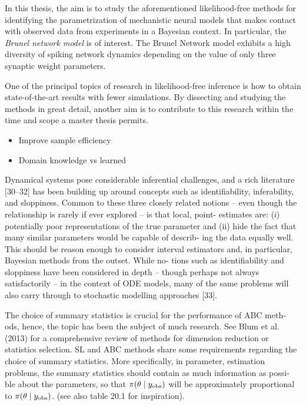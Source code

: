 In this thesis, the aim is to study the aforementioned likelihood-free methods for identifying the parametrization of mechanistic neural models that makes contact with observed data from experiments in a Bayesian context. In particular, the \textit{Brunel network model} is of interest. The Brunel Network model exhibits a high diversity of spiking network dynamics depending on the value of only three synaptic weight parameters.

One of the principal topics of research in likelihood-free inference is how to obtain state-of-the-art results with fewer simulations. By dissecting and studying the methods in great detail, another aim is to contribute to this research within the time and scope a master thesis permits. 


\begin{itemize}
    \item Improve sample efficiency
    \item Domain knowledge vs learned
\end{itemize}


Dynamical systems pose considerable inferential challenges, and a rich literature [30–32] has been building up around concepts such as identifiability, inferability, and sloppiness. Common to these three closely related notions – even though the relationship is rarely if ever explored – is that local, point- estimates are: (i) potentially poor representations of the true parameter and (ii) hide the fact that many similar parameters would be capable of describ- ing the data equally well. This should be reason enough to consider interval estimators and, in particular, Bayesian methods from the outset. While no- tions such as identifiability and sloppiness have been considered in depth – though perhaps not always satisfactorily – in the context of ODE models, many of the same problems will also carry through to stochastic modelling approaches [33]. \cite{ABC_ch17} 


The choice of summary statistics is crucial for the performance of ABC meth- ods, hence, the topic has been the subject of much research. See Blum et al. (2013) for a comprehensive review of methods for dimension reduction or statistics selection. SL and ABC methods share some requirements regarding the choice of summary statistics. More specifically, in parameter, estimation problems, the summary statistics should contain as much information as possi- ble about the parameters, so that $\pi \qty(\theta \mid y_\mathrm{obs})$ will be approximately proportional to $\pi \qty(\theta \mid y_\mathrm{obs})$. \cite{ABC_ch20} (see also table 20.1 for inspiration).
